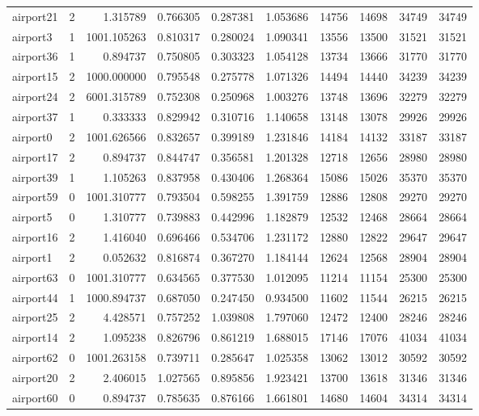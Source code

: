 \begin{longtable}{|l|r|r|r|r|r|r|r|r|r|}
airport21 & 2 & 1.315789 & 0.766305 & 0.287381 & 1.053686 & 14756 & 14698 & 34749 & 34749 \\
airport3 & 1 & 1001.105263 & 0.810317 & 0.280024 & 1.090341 & 13556 & 13500 & 31521 & 31521 \\
airport36 & 1 & 0.894737 & 0.750805 & 0.303323 & 1.054128 & 13734 & 13666 & 31770 & 31770 \\
airport15 & 2 & 1000.000000 & 0.795548 & 0.275778 & 1.071326 & 14494 & 14440 & 34239 & 34239 \\
airport24 & 2 & 6001.315789 & 0.752308 & 0.250968 & 1.003276 & 13748 & 13696 & 32279 & 32279 \\
airport37 & 1 & 0.333333 & 0.829942 & 0.310716 & 1.140658 & 13148 & 13078 & 29926 & 29926 \\
airport0 & 2 & 1001.626566 & 0.832657 & 0.399189 & 1.231846 & 14184 & 14132 & 33187 & 33187 \\
airport17 & 2 & 0.894737 & 0.844747 & 0.356581 & 1.201328 & 12718 & 12656 & 28980 & 28980 \\
airport39 & 1 & 1.105263 & 0.837958 & 0.430406 & 1.268364 & 15086 & 15026 & 35370 & 35370 \\
airport59 & 0 & 1001.310777 & 0.793504 & 0.598255 & 1.391759 & 12886 & 12808 & 29270 & 29270 \\
airport5 & 0 & 1.310777 & 0.739883 & 0.442996 & 1.182879 & 12532 & 12468 & 28664 & 28664 \\
airport16 & 2 & 1.416040 & 0.696466 & 0.534706 & 1.231172 & 12880 & 12822 & 29647 & 29647 \\
airport1 & 2 & 0.052632 & 0.816874 & 0.367270 & 1.184144 & 12624 & 12568 & 28904 & 28904 \\
airport63 & 0 & 1001.310777 & 0.634565 & 0.377530 & 1.012095 & 11214 & 11154 & 25300 & 25300 \\
airport44 & 1 & 1000.894737 & 0.687050 & 0.247450 & 0.934500 & 11602 & 11544 & 26215 & 26215 \\
airport25 & 2 & 4.428571 & 0.757252 & 1.039808 & 1.797060 & 12472 & 12400 & 28246 & 28246 \\
airport14 & 2 & 1.095238 & 0.826796 & 0.861219 & 1.688015 & 17146 & 17076 & 41034 & 41034 \\
airport62 & 0 & 1001.263158 & 0.739711 & 0.285647 & 1.025358 & 13062 & 13012 & 30592 & 30592 \\
airport20 & 2 & 2.406015 & 1.027565 & 0.895856 & 1.923421 & 13700 & 13618 & 31346 & 31346 \\
airport60 & 0 & 0.894737 & 0.785635 & 0.876166 & 1.661801 & 14680 & 14604 & 34314 & 34314 \\

\end{longtable}
